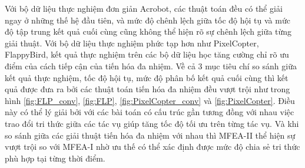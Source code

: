 Với bộ dữ liệu thực nghiệm đơn giản Acrobot, các thuật toán đều có thể giải ngay ở những thế hệ đầu tiên, và mức độ chênh lệch giữa tốc độ hội tụ và mức độ tập trung kết quả cuối cùng cũng không thể hiện rõ sự chênh lệch giữa từng giải thuật.
Với bộ dữ liệu thực nghiệm phức tạp hơn như PixelCopter, FlappyBird, kết quả thực nghiệm trên các bộ dữ liệu học tăng cường chỉ rõ ưu điểm của cách tiếp cận của tiến hóa đa nhiệm. Về cả 3 mục tiêu chí so sánh giữa kết quả thực nghiệm, tốc độ hội tụ, mức độ phân bố kết quả cuối cùng thì kết quả được đưa ra bởi các thuật toán tiến hóa đa nhiệm đều vượt trội như trong hình \ref{fig:FLP_conv}, \ref{fig:FLP}, \ref{fig:PixelCopter_conv} và \ref{fig:PixelCopter}. Điều này có thể lý giải bởi với các bài toán có cấu trúc gần tương đồng với nhau việc trao đổi tri thức giữa các tác vụ giúp tăng tốc độ tối ưu trên từng tác vụ.
Và khi so sánh giữa các giải thuật tiến hóa đa nhiệm với nhau thì MFEA-II thể hiện sự vượt trội so với MFEA-I nhờ ưu thế có thể xác định được mức độ chia sẻ tri thức phù hợp tại từng thời điểm.